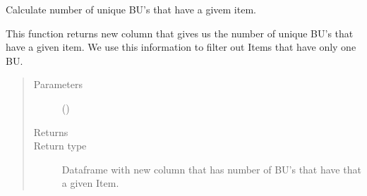 \documentclass[letterpaper,10pt,english]{sphinxmanual}
\begin{document}

\begin{fulllineitems}
\label{\detokenize{source/optimization.datatools:optimization.datatools.dataprep.how_many_bus_have_item}}
Calculate number of unique BU’s that have a givem item.

This function returns new column that gives us the number of
unique BU’s that have a given item. We use this information to
filter out Items that have only one BU.
\begin{quote}\begin{description}
\item[{Parameters}] \leavevmode
{} () \textendash{} 

\item[{Returns}] \leavevmode
{}

\item[{Return type}] \leavevmode
Dataframe with new column that has number of BU’s that have that a given Item.

\end{description}\end{quote}

\end{fulllineitems}

\end{document}
